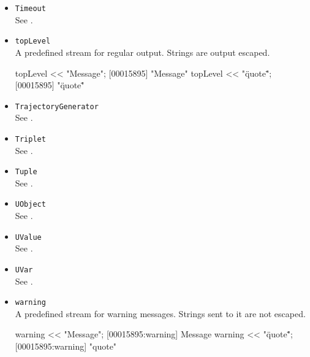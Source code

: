 \begin{itemize}
\item \lstinline|Timeout|\\
  See .

\item \lstinline|topLevel|\\
  A predefined stream for regular output.  Strings are output escaped.
\begin{urbiscript}[firstnumber=last]
topLevel << "Message";
[00015895] "Message"
topLevel << "\"quote\"";
[00015895] "\"quote\""
\end{urbiscript}

\item \lstinline|TrajectoryGenerator|\\
  See .

\item \lstinline|Triplet|\\
  See .

\item \lstinline|Tuple|\\
  See .

\item \lstinline|UObject|\\
  See .

\item \lstinline|UValue|\\
  See .

\item \lstinline|UVar|\\
  See .


\item \lstinline|warning|\\
  A predefined stream for warning messages.  Strings sent to it are
  not escaped.
\begin{urbiscript}[firstnumber=last]
warning << "Message";
[00015895:warning] Message
warning << "\"quote\"";
[00015895:warning] "quote"
\end{urbiscript}



\end{itemize}

